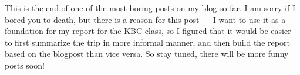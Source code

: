\begin{post}
\begin{content}

This is the end of one of the most boring posts on my blog so far. I am sorry if I bored you to death, but there is a reason for this post — I want to use it as a foundation for my report for the KBC class, so I figured that it would be easier to first summarize the trip in more informal manner, and then build the report based on the blogpost than vice versa. So stay tuned, there will be more funny posts soon!
	\end{content}
\end{post}
